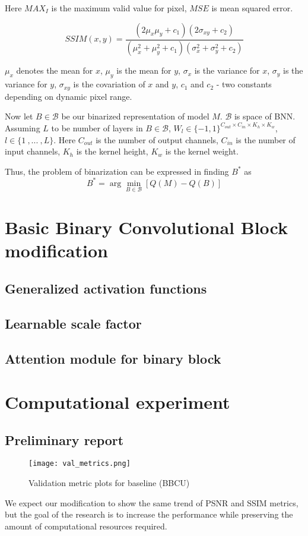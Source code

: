 \documentclass{article}
\begin{document}
Here $MAX_I$ is the maximum valid value for pixel, $MSE$ is mean squared error.

\begin{equation}
    SSIM(x, y) = \frac{(2\mu_x\mu_y + c_1)(2\sigma_{xy} + c_2)}{(\mu_x^2 + \mu_y^2 + c_1)(\sigma_{x}^2 + \sigma_{y}^2 + c_2)}
\end{equation}

$\mu_x$ denotes the mean for $x$, $\mu_y$ is the mean for $y$, $\sigma_x$ is the variance for $x$, $\sigma_y$ is the variance for $y$, $\sigma_{xy}$ is the covariation of $x$ and $y$, $c_1$ and $c_2$ - two constants depending on dynamic pixel range.

Now let $B \in \mathcal{B}$ be our binarized representation of model $M$. $\mathcal{B}$ is space of BNN. Assuming $L$ to be number of layers in $B \in \mathcal{B}$, $W_l \in \{-1, 1\}^{C_{out} \times C_{in} \times K_h \times K_w}$, $l \in \{1 \ , ... \ , L\}$. Here $C_{out}$ is the number of output channels, $C_{in}$ is the number of input channels, $K_h$ is the kernel height, $K_w$ is the kernel weight. 


Thus, the problem of binarization can be expressed in finding $B^{*}$ as
\begin{equation}
    B^{*} = \arg\min\limits_{B \in \mathcal{B}} \left[Q(M) - Q(B)\right]
\end{equation}

\section{Basic Binary Convolutional Block modification}

\subsection{Generalized activation functions}
\subsection{Learnable scale factor}
\subsection{Attention module for binary block}

\section{Computational experiment}
\subsection{Preliminary report}
\begin{figure}[h]
\caption{Validation metric plots for baseline (BBCU)}
\centering
\texttt{[image: val\_metrics.png]}
\end{figure}
We expect our modification to show the same trend of PSNR and SSIM metrics, but the goal of the research is to increase the performance while preserving the amount of computational resources required.




\end{document}
